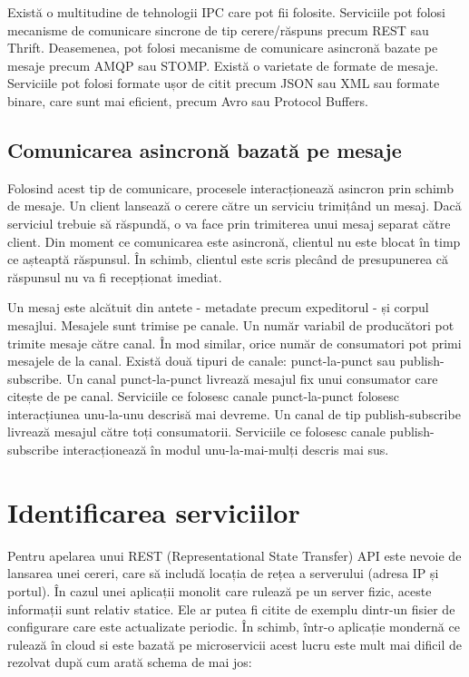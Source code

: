 \documentclass[12pt, a4paper, oneside, romanian]{teza-upb}
\begin{document}
Există o multitudine de tehnologii IPC care pot fii folosite. Serviciile pot folosi mecanisme de comunicare sincrone de tip cerere/răspuns precum REST sau Thrift. Deasemenea, pot folosi mecanisme de comunicare asincronă bazate pe mesaje precum AMQP sau STOMP. Există o varietate de formate de mesaje. Serviciile pot folosi formate ușor de citit precum JSON sau XML sau formate binare, care sunt mai eficient, precum Avro sau Protocol Buffers. 

\subsection{Comunicarea asincronă bazată pe mesaje}

Folosind acest tip de comunicare, procesele interacționează asincron prin schimb de mesaje. Un client lansează o cerere către un serviciu trimițând un mesaj. Dacă serviciul trebuie să răspundă, o va face prin trimiterea unui mesaj separat către client. Din moment ce comunicarea este asincronă, clientul nu este blocat în timp ce așteaptă răspunsul. În schimb, clientul este scris plecând de presupunerea că răspunsul nu va fi recepționat imediat. 

Un mesaj este alcătuit din antete - metadate precum expeditorul - și corpul mesajlui. Mesajele sunt trimise pe canale. Un număr variabil de producători pot trimite mesaje către canal. În mod similar, orice număr de consumatori pot primi mesajele de la canal. Există două tipuri de canale: punct-la-punct sau publish-subscribe. Un canal punct-la-punct livrează mesajul fix unui consumator care citește de pe canal. Serviciile ce folosesc canale punct-la-punct folosesc interacțiunea unu-la-unu descrisă mai devreme. Un canal de tip publish-subscribe livrează mesajul către toți consumatorii. Serviciile ce folosesc canale publish-subscribe interacționează în modul unu-la-mai-mulți descris mai sus. 

\section{Identificarea serviciilor}

Pentru apelarea unui REST (Representational State Transfer) API este nevoie de lansarea unei cereri, care să includă locația de rețea a serverului (adresa IP și portul). În cazul unei aplicații monolit care rulează pe un server fizic, aceste informații sunt relativ statice. Ele ar putea fi citite de exemplu dintr-un fisier de configurare care este actualizate periodic. În schimb, într-o aplicație mondernă ce rulează în cloud si este bazată pe microservicii acest lucru este mult mai dificil de rezolvat după cum arată schema de mai jos:
\end{document}
